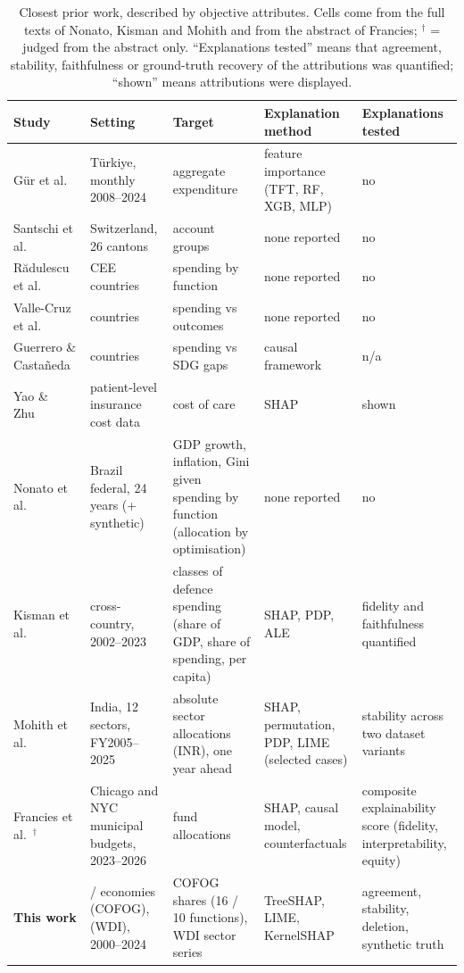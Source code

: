 \begin{table}[!t]
\caption{Closest prior work, described by objective attributes. Cells come from the full texts of Nonato, Kisman and Mohith and from the abstract of Francies; $^{\dagger}$ = judged from the abstract only. ``Explanations tested'' means that agreement, stability, faithfulness or ground-truth recovery of the attributions was quantified; ``shown'' means attributions were displayed.}\label{tab:gap}
\centering\footnotesize\setlength{\tabcolsep}{4pt}
\renewcommand{\arraystretch}{1.15}
\begin{tabular}{@{}>{\raggedright\arraybackslash}p{3.0cm}>{\raggedright\arraybackslash}p{3.9cm}>{\raggedright\arraybackslash}p{3.6cm}>{\raggedright\arraybackslash}p{3.2cm}>{\raggedright\arraybackslash}p{2.7cm}@{}}
\toprule
\textbf{Study} & \textbf{Setting} & \textbf{Target} & \textbf{Explanation method} & \textbf{Explanations tested}\\
\midrule
G\"ur et al.~\cite{gur2025} & T\"urkiye, monthly 2008--2024 & aggregate expenditure & feature importance (TFT, RF, XGB, MLP) & no\\
Santschi et al.~\cite{santschi2024} & Switzerland, 26 cantons & account groups & none reported & no\\
R\u{a}dulescu et al.~\cite{radulescu2015} & 5 CEE countries & spending by function & none reported & no\\
Valle-Cruz et al.~\cite{valle2022} & 217 countries & spending vs outcomes & none reported & no\\
Guerrero \& Casta\~neda~\cite{guerrero2022} & 140 countries & spending vs SDG gaps & causal framework & n/a\\
Yao \& Zhu~\cite{yao2025} & patient-level insurance cost data & cost of care & SHAP & shown\\
Nonato et al.~\cite{nonato2026} & Brazil federal, 24 years (+ synthetic) & GDP growth, inflation, Gini given spending by function (allocation by optimisation) & none reported & no\\
Kisman et al.~\cite{kisman2026} & cross-country, 2002--2023 & classes of defence spending (share of GDP, share of spending, per capita) & SHAP, PDP, ALE & fidelity and faithfulness quantified\\
Mohith et al.~\cite{mohith2026} & India, 12 sectors, FY2005--2025 & absolute sector allocations (INR), one year ahead & SHAP, permutation, PDP, LIME (selected cases) & stability across two dataset variants\\
Francies et al.~\cite{francies2026}$^{\dagger}$ & Chicago and NYC municipal budgets, 2023--2026 & fund allocations & SHAP, causal model, counterfactuals & composite explainability score (fidelity, interpretability, equity)\\
\midrule
\textbf{This work} & \NCofogCountries{} / \NTenEcon{} economies (COFOG), \NWdiCountries{} (WDI), 2000--2024 & COFOG shares (16 / 10 functions), WDI sector series & TreeSHAP, LIME, KernelSHAP & agreement, stability, deletion, synthetic truth\\
\bottomrule
\end{tabular}
\end{table}
